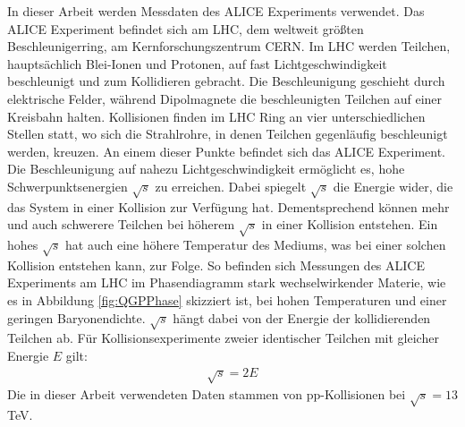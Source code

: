 In dieser Arbeit werden Messdaten des ALICE Experiments verwendet.
Das ALICE Experiment befindet sich am LHC, dem weltweit größten Beschleunigerring, am Kernforschungszentrum CERN.
Im LHC werden Teilchen, hauptsächlich Blei-Ionen und Protonen, auf fast Lichtgeschwindigkeit beschleunigt und zum Kollidieren gebracht.
Die Beschleunigung geschieht durch elektrische Felder, während Dipolmagnete die beschleunigten Teilchen auf einer Kreisbahn halten.
Kollisionen finden im LHC Ring an vier unterschiedlichen Stellen statt, wo sich die Strahlrohre, in denen Teilchen gegenläufig beschleunigt werden, kreuzen.
An einem dieser Punkte befindet sich das ALICE Experiment.
\newline
Die Beschleunigung auf nahezu Lichtgeschwindigkeit ermöglicht es, hohe Schwerpunktsenergien $\sqrt{s}$ zu erreichen.
Dabei spiegelt $\sqrt{s}$ die Energie wider, die das System in einer Kollision zur Verfügung hat.
Dementsprechend können mehr und auch schwerere Teilchen bei höherem $\sqrt{s}$  in einer Kollision entstehen.
Ein hohes $\sqrt{s}$ hat auch eine höhere Temperatur des Mediums, was bei einer solchen Kollision entstehen kann, zur Folge.
So befinden sich Messungen des ALICE Experiments am LHC im Phasendiagramm stark wechselwirkender Materie, wie es in Abbildung \ref{fig:QGPPhase} skizziert ist, bei hohen Temperaturen und einer geringen Baryonendichte.
$\sqrt{s}$ hängt dabei von der Energie der kollidierenden Teilchen ab.
Für Kollisionsexperimente zweier identischer Teilchen mit gleicher Energie $E$ gilt:
\begin{align}
\sqrt{s} = 2E \label{eq:sqrts}
\end{align}
\newline
Die in dieser Arbeit verwendeten Daten stammen von pp-Kollisionen bei $\sqrt{s} = 13$ TeV.